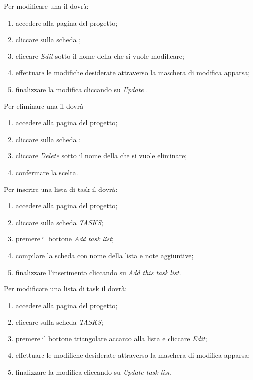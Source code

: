 			Per modificare una  il  dovrà:
			\begin{enumerate}
				\item accedere alla pagina del progetto;
				\item cliccare sulla scheda \textit{};
				\item cliccare \textit{Edit} sotto il nome della  che si vuole modificare;
				\item effettuare le modifiche desiderate attraverso la maschera di modifica apparsa;
				\item finalizzare la modifica cliccando su \textit{Update }.
			\end{enumerate}
			
			Per eliminare una  il  dovrà:
			\begin{enumerate}
				\item accedere alla pagina del progetto;
				\item cliccare sulla scheda \textit{};
				\item cliccare \textit{Delete} sotto il nome della  che si vuole eliminare;
				\item confermare la scelta.
			\end{enumerate}
			
			Per inserire una lista di task il  dovrà:
			\begin{enumerate}
				\item accedere alla pagina del progetto;
				\item cliccare sulla scheda \textit{TASKS};
				\item premere il bottone \textit{Add task list};
				\item compilare la scheda con nome della lista e note aggiuntive;
				\item finalizzare l'inserimento cliccando su \textit{Add this task list}.
			\end{enumerate}
			
			Per modificare una lista di task il  dovrà:
			\begin{enumerate}
				\item accedere alla pagina del progetto;
				\item cliccare sulla scheda \textit{TASKS};
				\item premere il bottone triangolare accanto alla lista e cliccare \textit{Edit};
				\item effettuare le modifiche desiderate attraverso la maschera di modifica apparsa;
				\item finalizzare la modifica cliccando su \textit{Update task list}.
			\end{enumerate}
			
